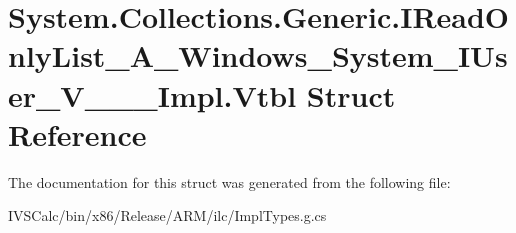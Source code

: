 \hypertarget{struct_system_1_1_collections_1_1_generic_1_1_i_read_only_list___a___windows___system___i_user___v_______impl_1_1_vtbl}{}\section{System.\+Collections.\+Generic.\+I\+Read\+Only\+List\+\_\+\+A\+\_\+\+Windows\+\_\+\+System\+\_\+\+I\+User\+\_\+\+V\+\_\+\+\_\+\+\_\+\+Impl.\+Vtbl Struct Reference}
\label{struct_system_1_1_collections_1_1_generic_1_1_i_read_only_list___a___windows___system___i_user___v_______impl_1_1_vtbl}


The documentation for this struct was generated from the following file\+:\begin{DoxyCompactItemize}
\item 
I\+V\+S\+Calc/bin/x86/\+Release/\+A\+R\+M/ilc/Impl\+Types.\+g.\+cs\end{DoxyCompactItemize}

